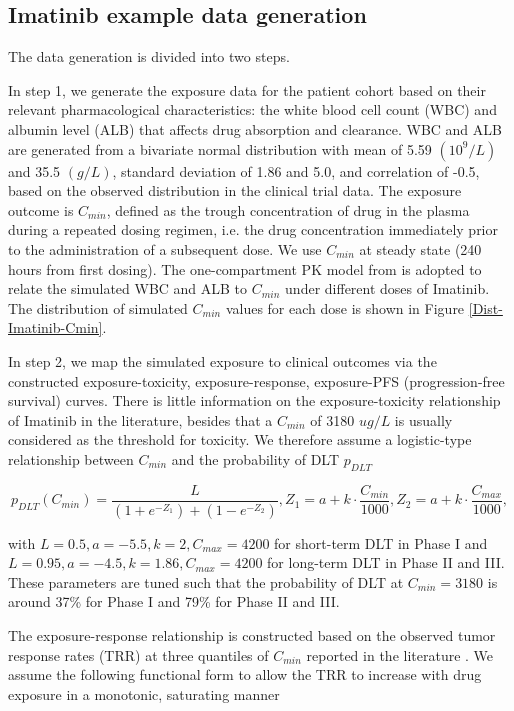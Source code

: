 \documentclass[11pt]{article}
\begin{document}
\subsection*{Imatinib example data generation}
The data generation is divided into two steps. 

In step 1, we generate the exposure data for the patient cohort based on their relevant pharmacological characteristics: the white blood cell count (WBC) and albumin level (ALB) that affects drug absorption and clearance. WBC and ALB are generated from a bivariate normal distribution with mean of 5.59 $(10^9/L)$ and 35.5 $(g/L)$, standard deviation of 1.86 and 5.0, and correlation of -0.5, based on the observed distribution in the clinical trial data. The exposure outcome is $C_{min}$, defined as the trough concentration of drug in the plasma during a repeated dosing regimen, i.e. the drug concentration immediately prior to the administration of a subsequent dose. We use $C_{min}$ at steady state (240 hours from first dosing). The one-compartment PK model from \textcite{demetri2009imatinib} is adopted to relate the simulated WBC and ALB to $C_{min}$ under different doses of Imatinib. The distribution of simulated $C_{min}$ values for each dose is shown in Figure \ref{Dist-Imatinib-Cmin}.

In step 2,  we map the simulated exposure to clinical outcomes via the constructed exposure-toxicity, exposure-response, exposure-PFS (progression-free survival) curves. There is little information on the exposure-toxicity relationship of Imatinib in the literature, besides that a $C_{min}$ of 3180 $ug/L$ is usually considered as the threshold for toxicity. We therefore assume a logistic-type relationship between $C_{min}$ and the probability of DLT $p_{DLT}$

$$p_{DLT}(C_{min}) = \frac{L}{(1+e^{-Z_1})+(1-e^{-Z_2})}, Z_1 = a+k\cdot \frac{C_{min}}{1000}, Z_2 = a+k\cdot \frac{C_{max}}{1000},$$

with $L=0.5, a=-5.5, k=2, C_{max}=4200$ for short-term DLT in Phase I and $L=0.95, a=-4.5, k=1.86, C_{max}=4200$ for long-term DLT in Phase II and III. These parameters are tuned such that the probability of DLT at $C_{min}=3180$ is around 37\% for Phase I and 79\% for Phase II and III.

The exposure-response relationship is constructed based on the observed tumor response rates (TRR) at three quantiles of $C_{min}$ reported in the literature \parencite{demetri2009imatinib}. We assume the following functional form to allow the TRR to increase with drug exposure in a monotonic, saturating manner
\end{document}
